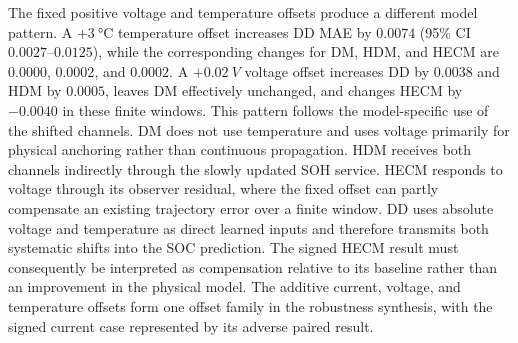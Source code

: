 \documentclass[review,nopreprintline]{elsarticle}
\begin{document}
The fixed positive voltage and temperature offsets produce a different model pattern. A $+\SI{3}{\celsius}$ temperature offset increases DD MAE by $0.0074$ (95\% CI $0.0027$--$0.0125$), while the corresponding changes for DM, HDM, and HECM are $0.0000$, $0.0002$, and $0.0002$. A $+\SI{0.02}{V}$ voltage offset increases DD by $0.0038$ and HDM by $0.0005$, leaves DM effectively unchanged, and changes HECM by $-0.0040$ in these finite windows. This pattern follows the model-specific use of the shifted channels. DM does not use temperature and uses voltage primarily for physical anchoring rather than continuous propagation. HDM receives both channels indirectly through the slowly updated SOH service. HECM responds to voltage through its observer residual, where the fixed offset can partly compensate an existing trajectory error over a finite window. DD uses absolute voltage and temperature as direct learned inputs and therefore transmits both systematic shifts into the SOC prediction. The signed HECM result must consequently be interpreted as compensation relative to its baseline rather than an improvement in the physical model. The additive current, voltage, and temperature offsets form one offset family in the robustness synthesis, with the signed current case represented by its adverse paired result.
\end{document}
